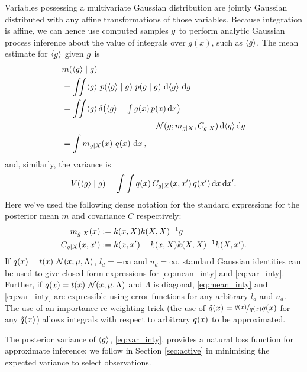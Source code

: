 \documentclass[twoside]{article}
\begin{document}
Variables possessing a multivariate Gaussian distribution are jointly Gaussian distributed with any affine transformations of those variables. Because integration is affine, we can hence use computed samples $g$ to perform analytic Gaussian process inference about the value of integrals over $g(x)$, such as $\langle g \rangle$. The mean estimate for $\langle g \rangle$ given $g$ is
%
\begin{align} 
&
\mean{\inty{g}}{\v{g}} 
\nonumber\\
& =\iint \inty{g}~\p{\inty{g}}{g}~\p{g}{\v{g}}~\ud \inty{g}~\ud g                                                                                                                                                               \nonumber\\
&
 =\iint \inty{g}\,\delta\bigl(\inty{g} - {\textstyle\int g(\vx)\,p(\vx)\,\ud \vx}\bigr)
\nonumber\\
& \hspace{4cm}
\N{g}{m_{g|X}}{C_{g|X}}\,\ud \inty{g} \,\ud g 
\nonumber\\
&
 = \int m_{g|X}(\vx)~q(\vx)~\ud \vx
\,, \label{eq:mean_inty}
\end{align}
and, similarly, the variance is
\begin{align} 
V(\langle g \rangle\mid g)
=\int \int q(x)\,C_{g|X}(x, x')\,q(x')\,\mathrm{d} x\,\mathrm{d} x'
. \label{eq:var_inty}
\end{align}
Here we've used the following dense notation for the standard \gp expressions for the posterior mean $m$ and covariance $C$ respectively:
\begin{align}
m_{g|X}(x)& := k(x, X) k(X, X)^{-1} g\\
C_{g|X}(x, x')& := k(x, x') - k(x, X) k(X, X)^{-1} k(X, x').
\end{align}
If $q(x)= t(x)~\mathcal{N}(x;\mu,\Lambda)$, $l_d=-\infty$ and $u_d=\infty$,  standard Gaussian identities \citep{BZMonteCarlo} can be used to give closed-form expressions for \eqref{eq:mean_inty} and \eqref{eq:var_inty}. Further, if $q(x)= t(x)~\mathcal{N}(x;\mu,\Lambda)$ and $\Lambda$ is diagonal, \eqref{eq:mean_inty} and \eqref{eq:var_inty} are expressible using error functions for any arbitrary $l_d$ and $u_d$.
The use of an importance re-weighting trick (the use of $\tilde{q}(x) = \nicefrac{\tilde{q}(x)}{q(x)} q(x)$ for any $\tilde{q}(x)$) allows integrals with respect to arbitrary $q(x)$ to be approximated. 

The posterior variance of $\langle g \rangle$, \eqref{eq:var_inty}, provides a natural loss function for approximate inference: we follow \citet{osborne2012active} in Section \ref{sec:active} in minimising the expected variance to select observations. 
\end{document}
